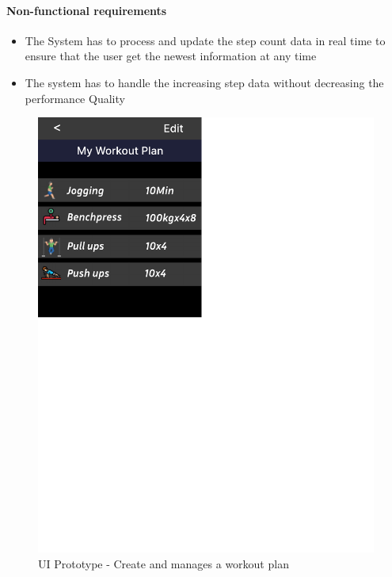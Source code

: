 \documentclass{article}
\begin{document}
		\paragraph{Non-functional requirements}
		\begin{itemize}
			\item The System has to process and update the step count data in real time to ensure that the user get the newest information at any time
			\item The system has to handle the increasing step data without decreasing the performance Quality
		\end{itemize}
		\clearpage
		\begin{figure}[h!]
			\centering
			\captionsetup{labelformat=empty}
		    	\includegraphics[scale=1.6, angle=0]{Marc/UIPrototype/workout.pdf}
			\caption{UI Prototype - Create and manages a workout plan}
		\end{figure}
		\clearpage
\end{document}
